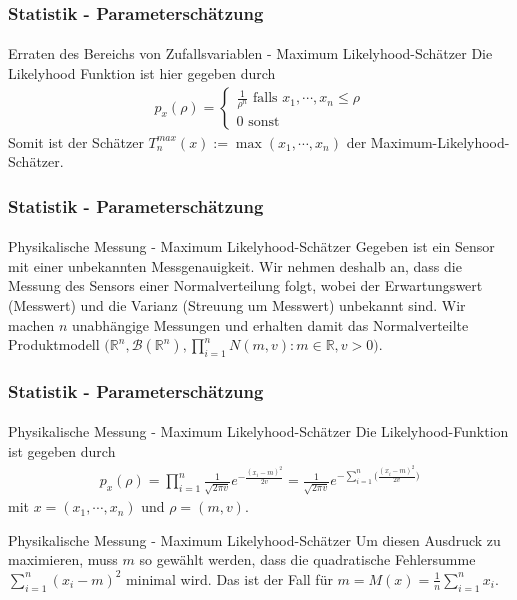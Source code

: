 \documentclass{beamer}
\begin{document}
\begin{frame}
    \frametitle{Statistik - Parameterschätzung}
\framesubtitle{}
\begin{block}{Erraten des Bereichs von Zufallsvariablen - Maximum Likelyhood-Schätzer}
Die Likelyhood Funktion ist hier gegeben durch
\begin{align*}
p_x (\rho) =  \begin{cases}  \frac{1}{\rho^n}  \text{ falls }  x_1, \cdots , x_n \leq \rho  \\  0  \text{ sonst}\end {cases}
\end{align*}
Somit ist der Schätzer $T_n^{max} (x) := \max (x_1, \cdots , x_n )$ der Maximum-Likelyhood-Schätzer.
\end{block}

 \end{frame}




\begin{frame}
    \frametitle{Statistik - Parameterschätzung}
\framesubtitle{}
\begin{block}{Physikalische Messung - Maximum Likelyhood-Schätzer}
Gegeben ist ein Sensor mit einer unbekannten Messgenauigkeit. Wir nehmen deshalb an, dass die Messung des Sensors einer Normalverteilung folgt, 
wobei der Erwartungswert (Messwert) und die Varianz (Streuung um Messwert) unbekannt sind. Wir machen $n$ unabhängige Messungen und erhalten damit das Normalverteilte Produktmodell $\bigl(\mathbb{R}^n, \mathcal{B}(\mathbb{R}^n), \prod_{i=1}^n N(m,v): m \in \mathbb{R}, v  >0 \bigr)$. 

\end{block}

 \end{frame}



\begin{frame}
    \frametitle{Statistik - Parameterschätzung}
\framesubtitle{}
\begin{block}{Physikalische Messung - Maximum Likelyhood-Schätzer}
Die Likelyhood-Funktion ist gegeben durch
\begin{align*}
p_x(\rho) =  \prod_{i=1}^n \frac {1}{ \sqrt{2 \pi v }} e^{- \frac{(x_i- m)^2}{ 2v}} =  \frac {1}{ \sqrt{2 \pi v }} e^{- \sum_{i=1}^n \bigl( \frac{(x_i- m)^2}{ 2v} \bigr)} 
\end{align*} 
mit $x = (x_1, \cdots, x_n)$ und $\rho=(m,v)$.
\end{block}

\begin{block}{Physikalische Messung - Maximum Likelyhood-Schätzer}
Um diesen Ausdruck zu maximieren, muss $m$ so gewählt werden, dass die quadratische Fehlersumme $ \sum_{i=1}^n (x_i- m)^2$ minimal wird.  Das ist der Fall für $m= M(x)= \frac{1}{n} \sum_{i=1}^n x_i$.
\end{block}

 \end{frame}
\end{document}
